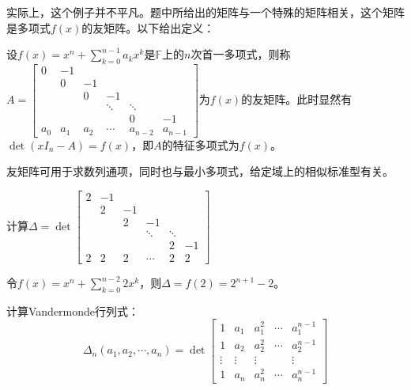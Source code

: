                 \begin{note}
                    实际上，这个例子并不平凡。题中所给出的矩阵与一个特殊的矩阵相关，这个矩阵是多项式$f(x)$的友矩阵。以下给出定义：
                \end{note}

                \begin{definition}[友矩阵]
                    设$f(x)=x^n+\sum\limits_{k=0}^{n-1}a_k x^k$是$\mathbb{F}$上的$n$次首一多项式，则称$A=\begin{bmatrix}0&-1\\&0&-1\\&&0&-1\\&&&\ddots&\ddots\\&&&&0&-1\\a_0&a_1&a_2&\cdots&a_{n-2}&a_{n-1}\end{bmatrix}$为$f(x)$的友矩阵。此时显然有$\det(xI_n-A)=f(x)$，即$A$的特征多项式为$f(x)$。
                \end{definition}

                \begin{note}
                    友矩阵可用于求数列通项，同时也与最小多项式，给定域上的相似标准型有关。
                \end{note}

                \begin{example}
                    计算$\Delta=\det\begin{bmatrix}2&-1\\&2&-1\\&&2&-1\\&&&\ddots&\ddots\\&&&&2&-1\\2&2&2&\cdots&2&2\end{bmatrix}$
                \end{example}

                \begin{solution}
                    令$f(x)=x^n+\sum\limits_{k=0}^{n-2}2x^k$，则$\Delta=f(2)=2^{n+1}-2$。
                \end{solution}

                \begin{example}
                    计算Vandermonde行列式：
                    \[
                        \Delta_n(a_1,a_2,\cdots,a_n)=\det\begin{bmatrix}1&a_1&a_1^2&\cdots&a_1^{n-1}\\1&a_2&a_2^2&\cdots&a_2^{n-1}\\\vdots&\vdots&\vdots&&\vdots\\1&a_n&a_n^2&\cdots&a_n^{n-1}\end{bmatrix}
                    \]
                \end{example}

